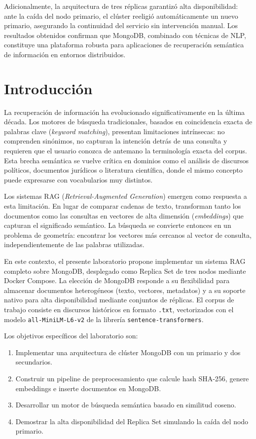 \documentclass[12pt,a4paper]{article}
\begin{document}
Adicionalmente, la arquitectura de tres réplicas garantizó alta disponibilidad: ante la caída del nodo primario, el clúster reeligió automáticamente un nuevo primario, asegurando la continuidad del servicio sin intervención manual. Los resultados obtenidos confirman que MongoDB, combinado con técnicas de NLP, constituye una plataforma robusta para aplicaciones de recuperación semántica de información en entornos distribuidos.

\section{Introducción}

La recuperación de información ha evolucionado significativamente en la última década. Los motores de búsqueda tradicionales, basados en coincidencia exacta de palabras clave (\textit{keyword matching}), presentan limitaciones intrínsecas: no comprenden sinónimos, no capturan la intención detrás de una consulta y requieren que el usuario conozca de antemano la terminología exacta del corpus. Esta brecha semántica se vuelve crítica en dominios como el análisis de discursos políticos, documentos jurídicos o literatura científica, donde el mismo concepto puede expresarse con vocabularios muy distintos.

Los sistemas RAG (\textit{Retrieval-Augmented Generation}) emergen como respuesta a esta limitación. En lugar de comparar cadenas de texto, transforman tanto los documentos como las consultas en vectores de alta dimensión (\textit{embeddings}) que capturan el significado semántico. La búsqueda se convierte entonces en un problema de geometría: encontrar los vectores más cercanos al vector de consulta, independientemente de las palabras utilizadas.

En este contexto, el presente laboratorio propone implementar un sistema RAG completo sobre MongoDB, desplegado como Replica Set de tres nodos mediante Docker Compose. La elección de MongoDB responde a su flexibilidad para almacenar documentos heterogéneos (texto, vectores, metadatos) y a su soporte nativo para alta disponibilidad mediante conjuntos de réplicas. El corpus de trabajo consiste en discursos históricos en formato \texttt{.txt}, vectorizados con el modelo \texttt{all-MiniLM-L6-v2} de la librería \texttt{sentence-transformers}.

Los objetivos específicos del laboratorio son:
\begin{enumerate}
    \item Implementar una arquitectura de clúster MongoDB con un primario y dos secundarios.
    \item Construir un pipeline de preprocesamiento que calcule hash SHA-256, genere embeddings e inserte documentos en MongoDB.
    \item Desarrollar un motor de búsqueda semántica basado en similitud coseno.
    \item Demostrar la alta disponibilidad del Replica Set simulando la caída del nodo primario.
\end{enumerate}
\end{document}
